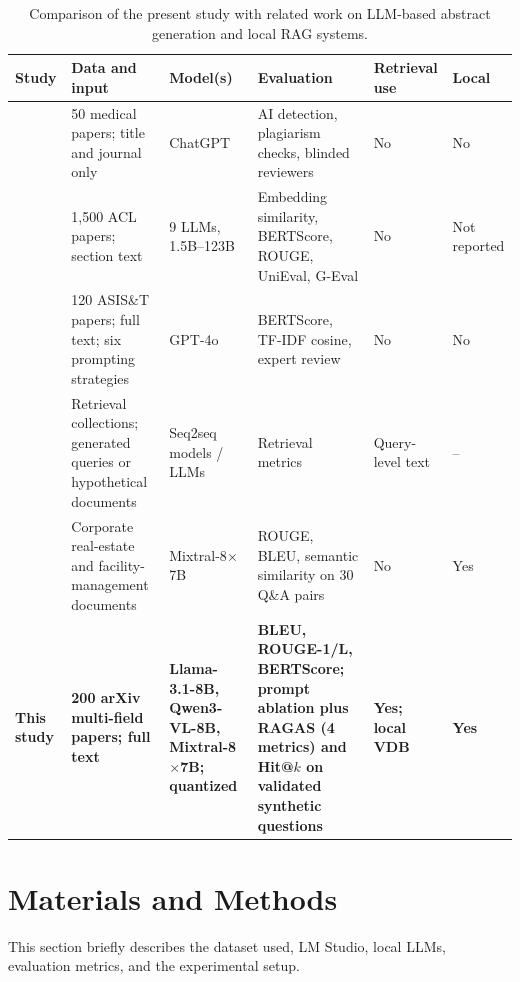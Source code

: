 \documentclass[bdcc,article,submit,pdftex,moreauthors]{Definitions/mdpi}
\begin{document}
\begin{table}[H]
\footnotesize
\centering
\caption{Comparison of the present study with related work on LLM-based abstract generation and local RAG systems.}
\label{tab:comparison_recent}
\renewcommand{\arraystretch}{1.25}
\setlength{\tabcolsep}{3pt}
\footnotesize
\begin{tabular}{p{1.8cm} p{2.5cm} p{2.4cm} p{2.7cm} p{1.35cm} p{0.9cm}}
\toprule
\textbf{Study} & \textbf{Data and input} & \textbf{Model(s)} & \textbf{Evaluation} & \textbf{Retrieval use} & \textbf{Local} \\
\midrule
\citet{gao2023comparing} & 50 medical papers; title and journal only & ChatGPT & AI detection, plagiarism checks, blinded reviewers & No & No \\[3pt]
\midrule
\citet{bektacs2025academic} & 1{,}500 ACL papers; section text & 9 LLMs, 1.5B--123B & Embedding similarity, BERTScore, ROUGE, UniEval, G-Eval & No & Not reported \\[3pt]
\midrule
\citet{kim2025exploring} & 120 ASIS\&T papers; full text; six prompting strategies & GPT-4o & BERTScore, TF-IDF cosine, expert review & No & No \\[3pt]
\midrule
\citet{nogueira2019document,gao2023precise} & Retrieval collections; generated queries or hypothetical documents & Seq2seq models / LLMs & Retrieval metrics & Query-level text & -- \\[3pt]
\midrule
\citet{krutli2025augmenting} & Corporate real-estate and facility-management documents & Mixtral-8$\times$7B & ROUGE, BLEU, semantic similarity on 30 Q\&A pairs & No & Yes \\[3pt]
\midrule
\textbf{This study} & \textbf{200 arXiv multi-field papers; full text} & \textbf{Llama-3.1-8B, Qwen3-VL-8B, Mixtral-8$\times$7B; quantized} & \textbf{BLEU, ROUGE-1/L, BERTScore; prompt ablation plus RAGAS (4 metrics) and Hit@$k$ on validated synthetic questions} & \textbf{Yes; local VDB} & \textbf{Yes} \\
\bottomrule
\end{tabular}
\end{table}

\section{Materials and Methods}
\label{sec:methodology}
This section briefly describes the dataset used, LM Studio, local LLMs, evaluation metrics, and the experimental setup.
\end{document}
